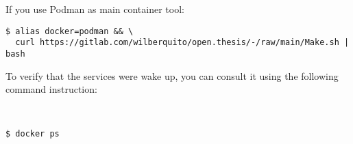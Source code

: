 If you use Podman as main container tool:

\begin{Verbatim}[fontsize=\small]
$ alias docker=podman && \
  curl https://gitlab.com/wilberquito/open.thesis/-/raw/main/Make.sh | bash
\end{Verbatim}

\newpage

To verify that the services were wake up, you can consult it using the following
command instruction:

\\

\begin{Verbatim}[fontsize=\small]
$ docker ps
\end{Verbatim}
